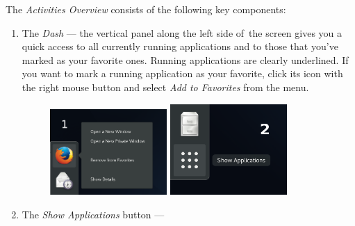 \newpage
The \emph{Activities Overview} consists of the following key components:
\begin{enumerate}
\item The \emph{Dash} --- the vertical panel along the left side of~the screen gives you a quick access to all currently running applications and to those that you've marked as your favorite ones. Running applications are clearly underlined. If you want to mark a running application as your favorite, click its icon with the right mouse button and select \emph{Add to Favorites} from the menu.

\begin{figure}[t]
\begin{center}
\includegraphics[width=0.42\textwidth]{img/dash-b}
 \label{fig:dash-b}
\bigskip
\includegraphics[width=0.42\textwidth]{img/dash-a}
 \label{fig:dash-a}
\end{center}
\end{figure}

\item The \emph{Show Applications} button --- 



\end{enumerate}
